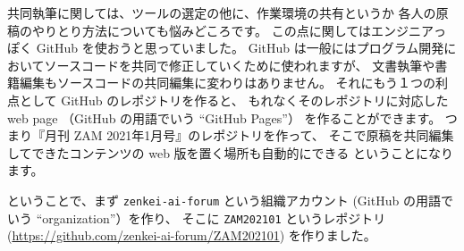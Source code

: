 \documentclass[dvipdfmx,autodetect-engine,10pt,b5paper,papersize,openany,dvipsnames]{jsbook}
\begin{document}
\begin{multicols}{2}
共同執筆に関しては、ツールの選定の他に、作業環境の共有というか
各人の原稿のやりとり方法についても悩みどころです。
この点に関してはエンジニアっぽく GitHub を使おうと思っていました。
GitHub は一般にはプログラム開発においてソースコードを共同で修正していくために使われますが、
文書執筆や書籍編集もソースコードの共同編集に変わりはありません。
それにもう１つの利点として GitHub のレポジトリを作ると、
もれなくそのレポジトリに対応した web page
（GitHub の用語でいう ``GitHub Pages''）
を作ることができます。
つまり『月刊 ZAM 2021年1月号』のレポジトリを作って、
そこで原稿を共同編集してできたコンテンツの web 版を置く場所も自動的にできる
ということになります。


\vspace{5.0cm}

ということで、まず \texttt{zenkei-ai-forum} という組織アカウント
(GitHub の用語でいう ``organization''）を作り、
そこに \texttt{ZAM202101} というレポジトリ
(\url{https://github.com/zenkei-ai-forum/ZAM202101})
を作りました。


\vspace{3.5cm}


\end{multicols}
\end{document}
